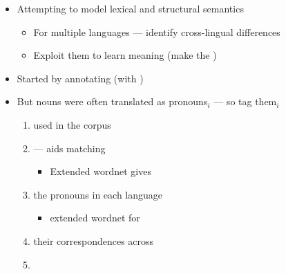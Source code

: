 \documentclass[a4paper,landscape,headrule,footrule,xetex]{foils}
\begin{document}

    \begin{itemize}
    \item Attempting to model lexical and structural semantics
    \begin{itemize}
    \item For multiple languages --- identify cross-lingual differences
    \item Exploit them to learn meaning (make the  )
    \end{itemize}
  \item Started by annotating  (with )
    \item But  nouns were often translated as pronouns$_i$ 
      --- so tag them$_i$
      \begin{enumerate}
      \item {} used in the corpus
      \item {} --- aids matching 
        \begin{itemize}
        \item Extended wordnet gives 
        \end{itemize}
      \item {} the pronouns  in each language
        \begin{itemize}
        \item {} extended wordnet for 
        \end{itemize}
      \item {} their correspondences across 
      \item {}
      \end{enumerate}
    \end{itemize}
\end{document}
